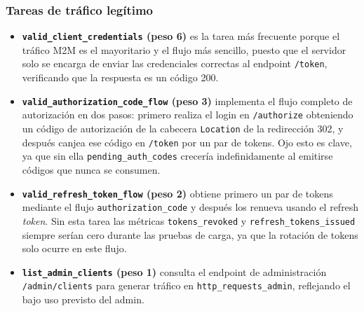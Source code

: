 \documentclass[12pt, a4paper]{article}
\begin{document}
			\subsubsection{Tareas de tráfico legítimo}
				\begin{itemize}
						\item \textbf{\texttt{valid\_client\_credentials} (peso 6)} es la tarea más frecuente porque el tráfico M2M es el mayoritario y el  flujo más sencillo, puesto que el servidor solo se encarga de enviar las credenciales correctas al endpoint \texttt{/token}, verificando que la respuesta es un código 200.
						\item \textbf{\texttt{valid\_authorization\_code\_flow} (peso 3)} implementa el flujo completo de autorización en dos pasos: primero realiza el login en \texttt{/authorize} obteniendo un código de autorización de la cabecera \texttt{Location} de la redirección 302, y después canjea ese código en \texttt{/token} por un par de tokens. Ojo esto es clave, ya que sin ella \texttt{pending\_auth\_codes} crecería indefinidamente al emitirse códigos que nunca se consumen.
						\item \textbf{\texttt{valid\_refresh\_token\_flow} (peso 2)} obtiene primero un par de tokens mediante el flujo \texttt{authorization\_code} y después los renueva usando el refresh \textit{token}. Sin esta tarea las métricas \texttt{tokens\_revoked} y \texttt{refresh\_tokens\_issued} siempre serían cero durante las pruebas de carga, ya que la rotación de tokens solo ocurre en este flujo.
						\item \textbf{\texttt{list\_admin\_clients} (peso 1)} consulta el endpoint de administración \texttt{/admin/clients} para generar tráfico en \texttt{http\_requests\_admin}, reflejando el bajo uso previsto del admin.
				\end{itemize}
		
\end{document}
